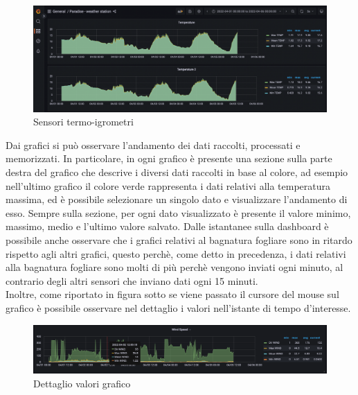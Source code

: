 \documentclass{article}
\begin{document}
\begin{figure}[H]
\includegraphics[width=1\linewidth]{Temperature-Graph}
\centering
\caption*{Sensori termo-igrometri}
\label{fig:bytepost}
\end{figure}

\noindent
Dai grafici si può osservare l'andamento dei dati raccolti, processati e memorizzati. In particolare, in ogni grafico è presente una sezione sulla parte destra del grafico che descrive i diversi dati raccolti in base al colore, ad esempio nell'ultimo grafico il colore verde rappresenta i dati relativi alla temperatura massima, ed è possibile selezionare un singolo dato e visualizzare l'andamento di esso. Sempre sulla sezione, per ogni dato visualizzato è presente il valore minimo, massimo, medio e l'ultimo valore salvato.
Dalle istantanee sulla dashboard è possibile anche osservare che i grafici relativi al bagnatura fogliare sono in ritardo rispetto agli altri grafici, questo perchè, come detto in precedenza, i dati relativi alla bagnatura fogliare sono molti di più perchè vengono inviati ogni minuto, al contrario degli altri sensori che inviano dati ogni 15 minuti. \\
Inoltre, come riportato in figura sotto se viene passato il cursore del mouse sul grafico è possibile osservare nel dettaglio i valori nell'istante di tempo d'interesse.

\medskip
\begin{figure}[H]
\includegraphics[width=1\linewidth]{Focus-Graph}
\centering
\caption*{Dettaglio valori grafico}
\label{fig:bytepost}
\end{figure}

\newpage
\end{document}
